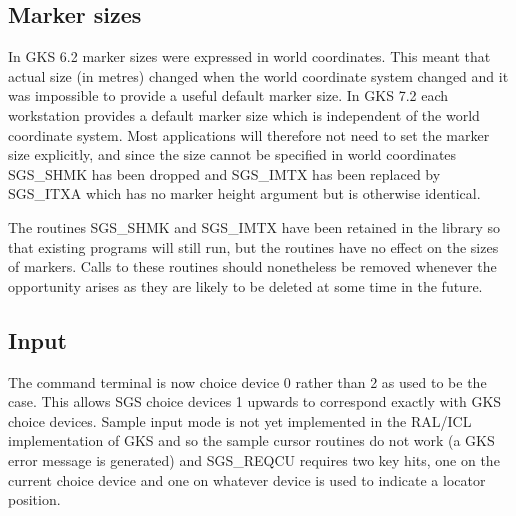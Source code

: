 \subsection* {Marker sizes}

In GKS 6.2 marker sizes were expressed in world coordinates.  This meant that
actual size (in metres) changed when the world coordinate system
changed and it was impossible to provide a useful default marker size.  In GKS 
7.2 each workstation provides a default marker size which is independent of
the world coordinate system.  Most applications will therefore not need to
set the marker size explicitly, and since the size cannot be 
specified in world 
coordinates SGS\_SHMK has been dropped and SGS\_IMTX has been replaced by
SGS\_ITXA which has no marker height argument but is otherwise identical.

The routines SGS\_SHMK and SGS\_IMTX have been retained in the library so that
existing programs will still run, but the routines have no effect 
on the sizes of
markers.  Calls to these routines should nonetheless be removed whenever
the opportunity arises as they are likely to be deleted at some time in the 
future.

\subsection* {Input}

The command terminal is now choice device 0 rather than 2 as used to be
the case.  This allows SGS
choice devices 1 upwards to correspond exactly with GKS choice devices.
Sample input mode is not yet implemented in the RAL/ICL implementation of 
GKS and so the sample
cursor routines do not work (a GKS error message is generated) and SGS\_REQCU
requires two key hits, one on the current choice device and one on whatever 
device is used to indicate a locator position.

